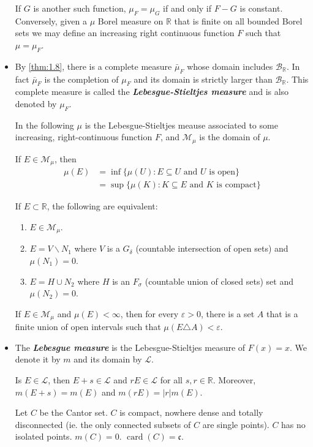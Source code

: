 \documentclass{article}
\theoremstyle{definition}
\numberwithin{equation}{section}
\newcommand{\R}{\mathbb{R}}
\begin{document}
\begin{itemize}
\begin{thm}
			If $G$ is another such function, $\mu_F=\mu_G$ if and only if $F-G$ is constant. Conversely, given a $\mu$ Borel measure on $\R$ that is finite on all bounded Borel sets we may define an increasing right continuous function $F$ such that $\mu=\mu_F$.
		\end{thm}
		\item By \cref{thm:1.8}, there is a complete measure $\bar{\mu}_F$ whose domain includes $\mathcal{B}_\R$. In fact $\bar{\mu}_F$ is the completion of $\mu_F$ and its domain is strictly larger than $\mathcal{B}_\R$. This complete measure is called the \textbf{\textit{Lebesgue-Stieltjes measure}} and is also denoted by $\mu_F$.
		
		In the following $\mu$ is the Lebesgue-Stieltjes meause associated to some increasing, right-continuous function $F$, and $\mathcal{M}_\mu$ is the domain of $\mu$. 
		\begin{thm}
			If $E\in\mathcal{M}_\mu$, then
			\begin{align*}
				\mu(E)&=\inf\{\mu(U):E\subseteq U \text{ and }U \text{ is open}\}\\
				&=\sup\{\mu(K):K\subseteq E \text{ and }K \text{ is compact}\}
			\end{align*}
		\end{thm}
		\begin{thm}
			If $E\subset \R$, the following are equivalent:
			\begin{enumerate}
				\item $E\in\mathcal{M}_\mu$.
				\item $E=V\backslash N_1$ where $V$ is a $G_\delta$ (countable intersection of open sets) and $\mu(N_1)=0$.
				\item $E=H\cup N_2$ where $H$ is an $F_\sigma$ (countable union of closed sets) set and $\mu(N_2)=0$.
			\end{enumerate}
		\end{thm}
		\begin{prop}
			If $E\in\mathcal{M}_\mu$ and $\mu(E)<\infty$, then for every $\varepsilon>0$, there is a set $A$ that is a finite union of open intervals such that $\mu(E\triangle A)<\varepsilon$.
		\end{prop}
		\item The \textbf{\textit{Lebesgue measure}} is the Lebesgue-Stieltjes measure of $F(x)=x$. We denote it by $m$ and its domain by $\mathcal{L}$.
		\begin{thm}
			Is $E\in\mathcal{L}$, then $E+s\in\mathcal{L}$ and $rE\in\mathcal{L}$ for all $s,r\in\R$. Moreover, $m(E+s)=m(E)$ and $m(rE)=|r|m(E)$.
		\end{thm}
		\begin{prop}
			Let $C$ be the Cantor set. $C$ is compact, nowhere dense and totally disconnected (ie. the only connected subsets of $C$ are single points). $C$ has no isolated points. $m(C)=0$. $\operatorname{card}(C)=\mathfrak{c}$.
		\end{prop}
	\end{itemize}
	
\end{document}
